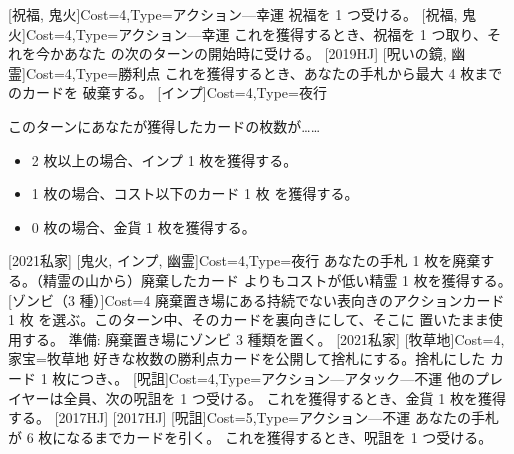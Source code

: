 \documentclass{waku}
\begin{document}
[祝福, 鬼火]{Cost=4,Type=アクション—幸運}{
	祝福を 1 つ受ける。
}
[祝福, 鬼火]{Cost=4,Type=アクション—幸運}{
	\hmbar
	これを獲得するとき、祝福を 1 つ取り、それを今かあなた
	の次のターンの開始時に受ける。
}[2019HJ]
[呪いの鏡, 幽霊]{Cost=4,Type=勝利点}{
	\Vanilla[2]{}
	\hmbar
	これを獲得するとき、あなたの手札から最大 4 枚までのカードを
	破棄する。
}
[インプ]{Cost=4,Type=夜行}{
	このターンにあなたが獲得したカードの枚数が……
	\begin{itemize}
		\item 2 枚以上の場合、インプ 1 枚を獲得する。
		\item 1 枚の場合、コスト以下のカード 1 枚
			を獲得する。
		\item 0 枚の場合、金貨 1 枚を獲得する。
	\end{itemize}
}[2021私家]
[鬼火, インプ, 幽霊]{Cost=4,Type=夜行}{
	あなたの手札 1 枚を廃棄する。（精霊の山から）廃棄したカード
	よりもコストが低い精霊 1 枚を獲得する。
}
[ゾンビ（3 種）]{Cost=4}{
	廃棄置き場にある持続でない表向きのアクションカード 1 枚
	を選ぶ。このターン中、そのカードを裏向きにして、そこに
	置いたまま使用する。
	\hmbar
	準備: 廃棄置き場にゾンビ 3 種類を置く。
}[2021私家]
[牧草地]{Cost=4,家宝=牧草地}{
	好きな枚数の勝利点カードを公開して捨札にする。捨札にした
	カード 1 枚につき、。
}
[呪詛]{Cost=4,Type=アクション—アタック—不運}{
	他のプレイヤーは全員、次の呪詛を 1 つ受ける。
	\hmbar
	これを獲得するとき、金貨 1 枚を獲得する。
}[2017HJ]
[2017HJ]
[呪詛]{Cost=5,Type=アクション—不運}{
	あなたの手札が 6 枚になるまでカードを引く。
	\hmbar
	これを獲得するとき、呪詛を 1 つ受ける。
}
\end{document}
